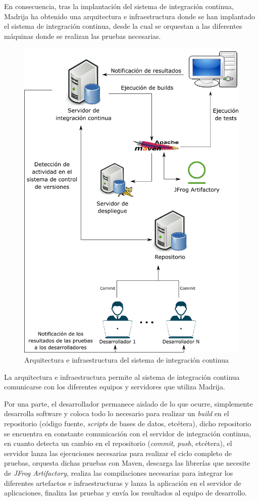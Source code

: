 \clearpage

En consecuencia, tras la implantación del sistema de integración continua, \ac{Madrija} ha obtenido una arquitectura e infraestructura donde se han implantado el sistema de integración continua, desde la cual se orquestan a las diferentes máquinas donde se realizan las pruebas necesarias.

\begin{figure}[!h]
\centering
   \includegraphics[width=12cm]{Prototipo_Sistema_IC.png}
\caption{Arquitectura e infraestructura del sistema de integración continua}
\end{figure}

La arquitectura e infraestructura permite al sistema de integración continua comunicarse con los diferentes equipos y servidores que utiliza \ac{Madrija}.

\clearpage

Por una parte, el desarrollador permanece aislado de lo que ocurre, simplemente desarrolla software y coloca todo lo necesario para realizar un \textit{build} en el repositorio (código fuente, \textit{scripts} de bases de datos, etcétera), dicho repositorio se encuentra en constante comunicación con el servidor de integración continua, en cuanto detecta un cambio en el repositorio (\textit{commit}, \textit{push}, etcétera), el servidor lanza las ejecuciones necesarias para realizar el ciclo completo de pruebas, orquesta dichas pruebas con Maven, descarga las librerías que necesite de \textit{JFrog Artifactory}, realiza las compilaciones necesarias para integrar los diferentes artefactos e infraestructuras y lanza la aplicación en el servidor de aplicaciones, finaliza las pruebas y envía los resultados al equipo de desarrollo.


